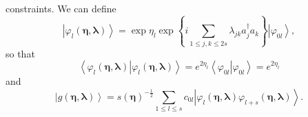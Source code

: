 \documentclass[aps,preprint]{revtex4}%
\begin{document}
constraints. We can define%
\begin{equation}
\left\vert \varphi_{l}\left(  \mathbf{\eta,\lambda}\right)  \right\rangle
=\exp\eta_{l}\exp\left\{  i\sum_{1\leq j,k\leq2s}\lambda_{jk}a_{j}^{\dagger
}a_{k}\right\}  \left\vert \varphi_{0l}\right\rangle ,
\end{equation}
so that
\begin{equation}
\left\langle \left.  \varphi_{l}\left(  \mathbf{\eta,\lambda}\right)
\right\vert \varphi_{l}\left(  \mathbf{\eta,\lambda}\right)  \right\rangle
=e^{2\eta_{l}}\left\langle \left.  \varphi_{0l}\right\vert \varphi
_{0l}\right\rangle =e^{2\eta_{l}}%
\end{equation}
and
\begin{equation}
\left\vert g\left(  \mathbf{\eta},\mathbf{\lambda}\right)  \right\rangle
=\mathit{s}\left(  \mathbf{\eta}\right)  ^{-\frac{1}{2}}\sum_{1\leq l\leq
s}c_{0l}\left\vert \varphi_{l}\left(  \mathbf{\eta,\lambda}\right)
\varphi_{l+s}\left(  \mathbf{\eta,\lambda}\right)  \right\rangle .
\end{equation}
\end{document}
